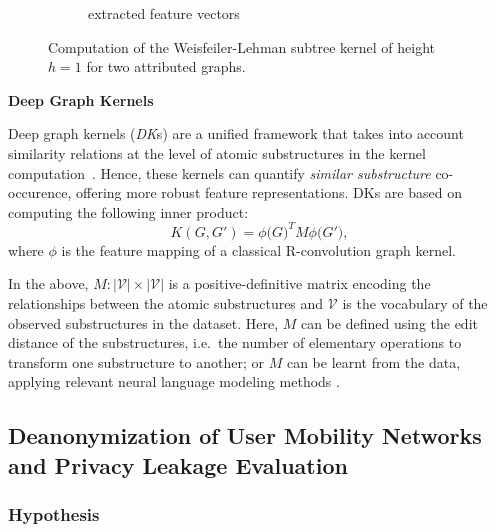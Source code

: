 \begin{figure*}[!h]
\begin{subfigure}[t]{.57\textwidth}
		\caption{extracted feature vectors} \label{fig:feat_G}
	\end{subfigure}
	
	
	\caption{{Computation of the Weisfeiler-Lehman subtree kernel of height $ h=1 $ for two attributed graphs.}}
	\label{fig:WL}
\end{figure*}


\vspace{1em}
\noindent\textbf{Deep Graph Kernels}

Deep graph kernels (\emph{DK}s) are a unified framework that takes into account similarity relations at the level of atomic substructures in the kernel computation~\cite{yanardagV15}.
Hence, these kernels can quantify \emph{similar substructure} co-occurence, offering more robust feature representations.
DKs are based on computing the following inner product:
\[
K(G, G') = \phi\big(G\big)^T M \phi\big(G'\big),
\]
where $ \phi $ is the feature mapping of a classical R-convolution graph kernel.

In the above, $M : |\mathcal{V}| \times |\mathcal{V}|$ is a positive-definitive matrix encoding the relationships between the atomic substructures and $ \mathcal{V} $ is the vocabulary of the observed substructures in the dataset.
Here, $ M $ can be defined using the edit distance of the substructures, i.e.\ the number of elementary operations to transform one substructure to another; or $ M $ can be learnt from the data, applying relevant neural language modeling methods \cite{mikolov2013efficient}.

\subsection{Deanonymization of User Mobility Networks and Privacy Leakage Evaluation\label{sec:deanon-leakage}}

\subsubsection{Hypothesis}


